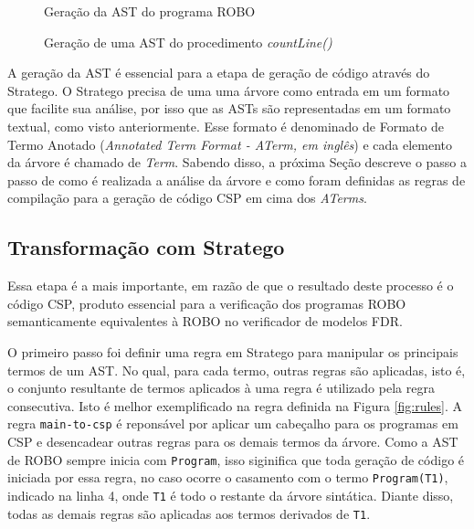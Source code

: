 \begin{figure}[h]
\centering
\caption{Geração da AST do programa ROBO}

\label{fig:ast1}
\end{figure}

\begin{figure}[h]
\centering
\caption{Geração de uma AST do procedimento \textit{countLine()}}

\label{fig:ast2}
\end{figure}

A geração da AST é essencial para a etapa de geração de código através do Stratego. O Stratego precisa de uma uma árvore como entrada em um formato que facilite sua análise, por isso que as ASTs são representadas em um formato textual, como visto anteriormente. Esse formato é denominado de Formato de Termo Anotado (\textit{Annotated Term Format - ATerm, em inglês}) e cada elemento da árvore é chamado de \textit{Term}. Sabendo disso, a próxima Seção descreve o passo a passo de como é realizada a análise da árvore e como foram definidas as regras de compilação para a geração de código CSP em cima dos \textit{ATerms}.

\subsection{Transformação com Stratego}

Essa etapa é a mais importante, em razão de que o resultado deste processo é o código CSP, produto essencial para a verificação dos programas ROBO semanticamente equivalentes à ROBO no verificador de modelos FDR.

O primeiro passo foi definir uma regra em Stratego para manipular os principais termos de um AST. No qual, para cada termo, outras regras são aplicadas, isto é, o conjunto resultante de termos aplicados à uma regra é utilizado pela regra consecutiva. Isto é melhor exemplificado na regra definida na Figura \ref{fig:rules}. A regra \texttt{main-to-csp} é reponsável por aplicar um cabeçalho para os programas em CSP e desencadear outras regras para os demais termos da árvore. Como a AST de ROBO sempre inicia com \texttt{Program}, isso siginifica que toda geração de código é iniciada por essa regra, no caso ocorre o casamento com o termo \texttt{Program(T1)}, indicado na linha 4, onde \texttt{T1} é todo o restante da árvore sintática. Diante disso, todas as demais regras são aplicadas aos termos derivados de \texttt{T1}.

